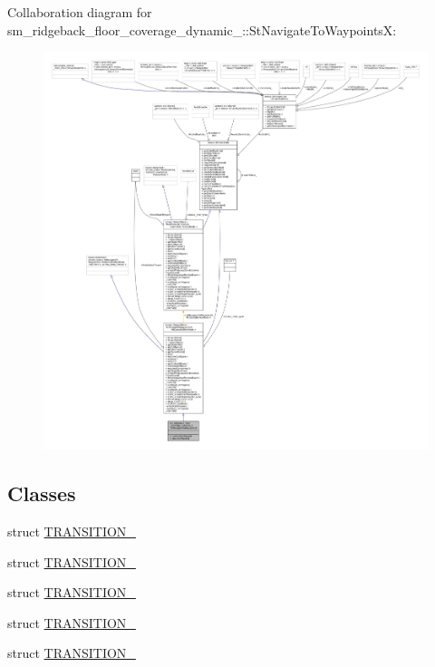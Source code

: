 Collaboration diagram for sm\+\_\+ridgeback\+\_\+floor\+\_\+coverage\+\_\+dynamic\+\_\+:\+:St\+Navigate\+To\+WaypointsX\+:
\nopagebreak
\begin{figure}[H]
\begin{center}
\leavevmode
\includegraphics[width=350pt]{structsm__ridgeback__floor__coverage__dynamic__1_1_1StNavigateToWaypointsX__coll__graph}
\end{center}
\end{figure}
\subsection*{Classes}
\begin{DoxyCompactItemize}
\item 
struct \hyperlink{structsm__ridgeback__floor__coverage__dynamic__1_1_1StNavigateToWaypointsX_1_1TRANSITION__1}{T\+R\+A\+N\+S\+I\+T\+I\+O\+N\+\_}
\item 
struct \hyperlink{structsm__ridgeback__floor__coverage__dynamic__1_1_1StNavigateToWaypointsX_1_1TRANSITION__2}{T\+R\+A\+N\+S\+I\+T\+I\+O\+N\+\_}
\item 
struct \hyperlink{structsm__ridgeback__floor__coverage__dynamic__1_1_1StNavigateToWaypointsX_1_1TRANSITION__3}{T\+R\+A\+N\+S\+I\+T\+I\+O\+N\+\_}
\item 
struct \hyperlink{structsm__ridgeback__floor__coverage__dynamic__1_1_1StNavigateToWaypointsX_1_1TRANSITION__4}{T\+R\+A\+N\+S\+I\+T\+I\+O\+N\+\_}
\item 
struct \hyperlink{structsm__ridgeback__floor__coverage__dynamic__1_1_1StNavigateToWaypointsX_1_1TRANSITION__5}{T\+R\+A\+N\+S\+I\+T\+I\+O\+N\+\_}
\end{DoxyCompactItemize}
